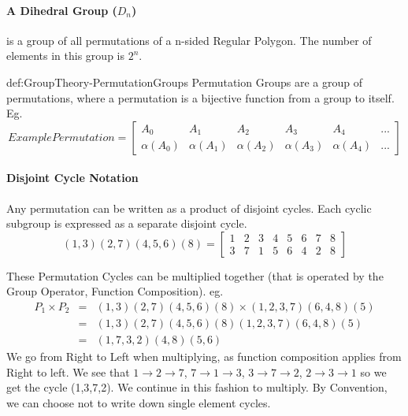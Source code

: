 \paragraph{A Dihedral Group ($D_n$)} is a group of all permutations of a n-sided Regular
Polygon. The number of elements in this group is $2^n$.

\begin{definition}{def:GroupTheory-PermutationGroups}
Permutation Groups are a group of permutations, where a permutation is a
bijective function from a group to itself. Eg.
\begin{equation}
    Example Permutation = 
    \begin{bmatrix}
        A_0 & A_1 & A_2 & A_3 & A_4 & ... \\
        \alpha(A_0) & \alpha(A_1) & \alpha(A_2) & \alpha(A_3) & \alpha(A_4) & ... 
    \end{bmatrix}
\end{equation}
\end{definition}

\paragraph{Disjoint Cycle Notation} Any permutation can be written as a product of disjoint cycles.
Each cyclic subgroup is expressed as a separate disjoint cycle.
\begin{equation}
    (1,3)(2,7)(4,5,6)(8) =
    \begin{bmatrix} 
        1 & 2 & 3 & 4 & 5 & 6 & 7 & 8 \\ 
        3 & 7 & 1 & 5 & 6 & 4 & 2 & 8 
    \end{bmatrix}
\end{equation}

These Permutation Cycles can be multiplied together (that is operated by the Group Operator, Function Composition). eg.
\begin{eqnarray*}
    P_1 \times P_2 
    & = & (1,3)(2,7)(4,5,6)(8) \times (1,2,3,7)(6,4,8)(5) \\
    & = & (1,3)(2,7)(4,5,6)(8)(1,2,3,7)(6,4,8)(5) \\
    & = & (1,7,3,2)(4,8)(5,6)
\end{eqnarray*}
We go from Right to Left when multiplying, as function composition applies from Right to left.
We see that $1 \rightarrow 2 \rightarrow 7$, $7 \rightarrow 1 \rightarrow 3$, $3 \rightarrow 7 \rightarrow 2$, $2 \rightarrow 3 \rightarrow 1$ so we get the cycle (1,3,7,2). We continue in this fashion to multiply.
By Convention, we can choose not to write down single element cycles.

